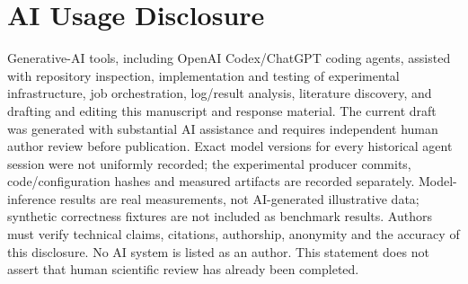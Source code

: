 \section*{AI Usage Disclosure}
Generative-AI tools, including OpenAI Codex/ChatGPT coding agents, assisted
with repository inspection, implementation and testing of experimental
infrastructure, job orchestration, log/result analysis, literature discovery,
and drafting and editing this manuscript and response material. The current
draft was generated with substantial AI assistance and requires independent
human author review before publication. Exact model versions for every
historical agent session were not uniformly recorded; the experimental
producer commits, code/configuration hashes and measured artifacts are
recorded separately. Model-inference results are real measurements, not
AI-generated illustrative data; synthetic correctness fixtures are not
included as benchmark results. Authors must verify technical claims,
citations, authorship, anonymity and the accuracy of this disclosure. No
AI system is listed as an author. This statement does not assert that
human scientific review has already been completed.
